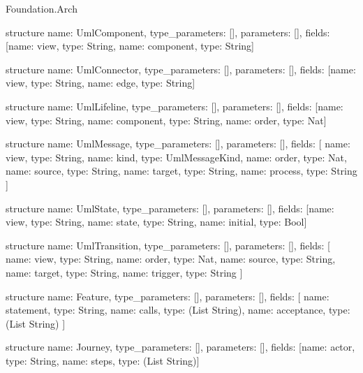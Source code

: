 \begin{lexlean}{Foundation.Arch}
\begin{semanticmodule}
structure{
  name: UmlComponent,
  type_parameters: [],
  parameters: [],
  fields: [{name: view, type: String}, {name: component, type: String}]
}

structure{
  name: UmlConnector,
  type_parameters: [],
  parameters: [],
  fields: [{name: view, type: String}, {name: edge, type: String}]
}

structure{
  name: UmlLifeline,
  type_parameters: [],
  parameters: [],
  fields: [{name: view, type: String}, {name: component, type: String}, {name: order, type: Nat}]
}

structure{
  name: UmlMessage,
  type_parameters: [],
  parameters: [],
  fields: [
    {name: view, type: String},
    {name: kind, type: UmlMessageKind},
    {name: order, type: Nat},
    {name: source, type: String},
    {name: target, type: String},
    {name: process, type: String}
  ]
}

structure{
  name: UmlState,
  type_parameters: [],
  parameters: [],
  fields: [{name: view, type: String}, {name: state, type: String}, {name: initial, type: Bool}]
}

structure{
  name: UmlTransition,
  type_parameters: [],
  parameters: [],
  fields: [
    {name: view, type: String},
    {name: order, type: Nat},
    {name: source, type: String},
    {name: target, type: String},
    {name: trigger, type: String}
  ]
}

structure{
  name: Feature,
  type_parameters: [],
  parameters: [],
  fields: [
    {name: statement, type: String},
    {name: calls, type: (List String)},
    {name: acceptance, type: (List String)}
  ]
}

structure{
  name: Journey,
  type_parameters: [],
  parameters: [],
  fields: [{name: actor, type: String}, {name: steps, type: (List String)}]
}
\end{semanticmodule}
\end{lexlean}
